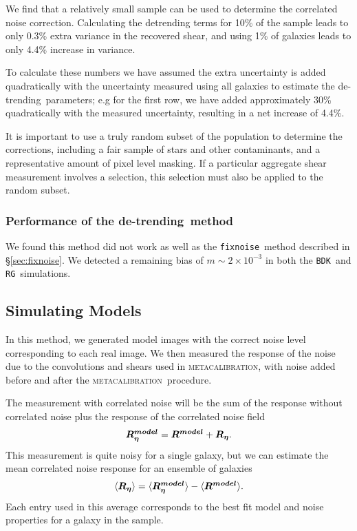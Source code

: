 \documentclass[iop]{emulateapj}
\newcommand{\mcal}{\textsc{metacalibration}}
\newcommand{\mcalRnoise}{\mbox{\boldmath $R_\eta$}}
\newcommand{\mcalRmodel}{\mbox{\boldmath $R^{model}$}}
\newcommand{\mcalRnoisemodel}{\mbox{\boldmath $R^{model}_\eta$}}
\newcommand{\detrend}{de-trending}
\newcommand{\fixnoise}{\texttt{fixnoise}}
\newcommand{\bdsim}{\texttt{BDK}}
\newcommand{\rgsim}{\texttt{RG}}
\begin{document}
We find that a relatively small sample can be used to determine the correlated
noise correction.  Calculating the detrending terms for 10\% of the sample
leads to only 0.3\% extra variance in the recovered shear, and using 1\% of
galaxies leads to only 4.4\% increase in variance.

To calculate these numbers we have assumed the extra uncertainty is added
quadratically with the uncertainty measured using all galaxies to estimate the
\detrend\ parameters; e.g for the first row, we have added approximately 30\%
quadratically with the measured uncertainty, resulting in a net increase of
4.4\%.

It is important to use a truly random subset of the population to determine the
corrections, including a fair sample of stars and other contaminants, and a
representative amount of pixel level masking.  If a particular aggregate shear
measurement involves a selection, this selection must also be applied to the
random subset.

\subsubsection{Performance of the \detrend\ method}

We found this method did not work as well as the \fixnoise\ method
described in \S \ref{sec:fixnoise}.  We detected a remaining bias
of $m \sim 2 \times 10^{-3}$ in both the \bdsim\ and \rgsim\ simulations.

\subsection{Simulating Models}

In this method, we generated model images with the correct noise level corresponding
to each real image.  We then measured the response of the noise due to the
convolutions and shears used in \mcal, with noise added before and
after the \mcal\ procedure.

The measurement with correlated noise will be the sum of the response
without correlated noise plus the response of the correlated noise field
\begin{equation}
    \mcalRnoisemodel = \mcalRmodel + \mcalRnoise.
\end{equation}
This measurement is quite noisy for a single galaxy, but we
can estimate the mean correlated noise response for an ensemble
of galaxies
\begin{equation}
    \langle \mcalRnoise \rangle = \langle \mcalRnoisemodel \rangle - \langle \mcalRmodel \rangle.
\end{equation}
Each entry used in this average corresponds to the best fit model
and noise properties for a galaxy in the sample.
\end{document}
